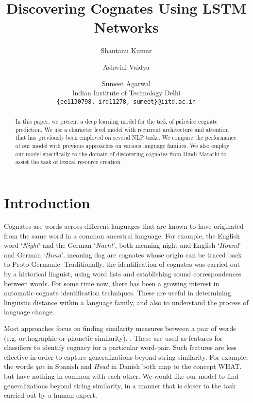 \documentclass[11pt,letterpaper]{article}
\title{Discovering Cognates Using LSTM Networks}
\author{Shantanu Kumar \and Ashwini Vaidya \and Sumeet Agarwal \\ 
  Indian Institute of Technology Delhi
  \\ {\tt \{ee1130798, ird11278, sumeet\}@iitd.ac.in}}
\date{}
\begin{document}
\maketitle

\begin{abstract}
In this paper, we present a deep learning model for the task of pairwise cognate prediction. We use a character level model with recurrent architecture and attention that has previously been employed on several NLP tasks. We compare the performance of our model with previous approaches on various language families. We also employ our model specifically to the domain of discovering cognates from Hindi-Marathi to assist the task of lexical resource creation.
\end{abstract}

\section{Introduction}
Cognates are words across different languages that are known to have originated from the same word in a common ancestral language. For example, the English word `\textit{Night}' and the German `\textit{Nacht}’, both meaning night and English `\textit{Hound}’ and German `\textit{Hund}’, meaning dog are cognates whose origin can be traced back to Proto-Germanic. Traditionally, the identification of cognates was carried out by a historical linguist, using word lists and establishing sound correspondences between words. For some time now, there has been a growing interest in automatic cognate identification techniques. These are useful in determining linguistic distance within a language family, and also to understand the process of language change. 

Most approaches focus on finding similarity measures between a pair of words (e.g. orthographic or phonetic similarity). \citep{hauer2011clustering, inkpen2005similarity,List2016g}. These are used as features for classifiers to identify cognacy for a particular word-pair. Such features are less effective in order to capture generalizations beyond  string similarity. For example, the words \textit{que} in Spanish and \textit{Hvad} in Danish both map to the concept \textsc{WHAT}, but have nothing in common with each other. We would like our model to find generalizations beyond string similarity, in a manner that is closer to the task carried out by a human expert. 
\end{document}

